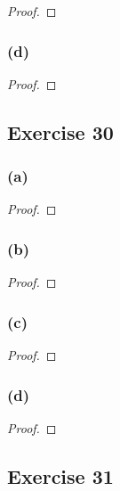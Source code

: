 \documentclass[14pt]{extarticle}
\begin{document}
\begin{proof}

\end{proof}

\subsubsection{(d)}

\begin{proof}

\end{proof}

\subsection{Exercise 30}

\subsubsection{(a)}

\begin{proof}

\end{proof}

\subsubsection{(b)}

\begin{proof}

\end{proof}

\subsubsection{(c)}

\begin{proof}

\end{proof}

\subsubsection{(d)}

\begin{proof}

\end{proof}

\subsection{Exercise 31}
\end{document}
